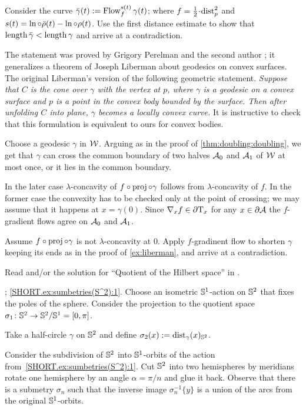 Consider the curve $\bar\gamma(t)\mathrel{:=} \mathop{\rm Flow}\nolimits_f^{s(t)}\gamma(t)$;
where $f=\tfrac12\cdot\distfun_p^2$ and $s(t)=\ln\circ\bar\rho(t)-\ln\circ\rho(t)$.
Use the first distance estimate to show that $\mathop{\rm length}\nolimits\bar\gamma<\mathop{\rm length}\nolimits\gamma$ and arrive at a contradiction.

The statement was proved by Grigory Perelman and the second author \cite{perelman-petrunin};
it generalizes a theorem of Joseph Liberman \cite{liberman} about geodesics on convex surfaces.
The original Liberman's version of the following geometric statement.
\textit{Suppose that $C$ is the cone over $\gamma$ with the vertex at $p$,
where $\gamma$ is a geodesic on a convex surface and $p$ is a point in the convex body bounded by the surface.
Then after unfolding $C$ into plane, $\gamma$ becomes a locally convex curve.}
It is instructive to check that this formulation is equivalent to ours for convex bodies.

Choose a geodesic $\gamma$ in $\mathcal{W}$.
Arguing as in the proof of \ref{thm:doubling:doubling}, we get 
that $\gamma$ can cross the common boundary of two halves $\mathcal{A}_0$ and $\mathcal{A}_1$ of $\mathcal{W}$ at most once, or it lies in the common boundary.

In the later case $\lambda$-concavity of $f\circ\operatorname{\rm proj}\nolimits\circ\gamma$ follows from $\lambda$-concavity of $f$.
In the former case the convexity has to be checked only at the point of crossing;
we may assume that it happens at $x=\gamma(0)$.
Since $\nabla_xf\in\partial\mathrm{T}_x$ for any $x\in\partial\mathcal{A}$ the $f$-gradient flows agree on $\mathcal{A}_0$ and $\mathcal{A}_1$.

Assume $f\circ\operatorname{\rm proj}\nolimits\circ\gamma$ is not $\lambda$-concavity at $0$.
Apply $f$-gradinent flow to shorten $\gamma$ keeping its ends as in the proof of \ref{ex:liberman},
and arrive at a contradiction.

 Read \cite[Section 4]{terng-thorbergsson} and/or the solution for ``Quotient of the Hilbert space'' in \cite{petrunin2020}.

\parbf{\ref{ex:sumbetries(S^2)}}; \ref{SHORT.ex:sumbetries(S^2):1}.
Choose an isometric $\mathbb{S}^1$-action on $\mathbb{S}^2$ that fixes the poles of the sphere.
Consider the projection to the quotient space $\sigma_1\colon\mathbb{S}^2\to \mathbb{S}^2/\mathbb{S}^1=[0,\pi]$.

Take a half-circle $\gamma$ on $\mathbb{S}^2$ and define 
$\sigma_2(x)\mathrel{:=}\mathrm{dist}_\gamma(x)_{\mathbb{S}^2}$.

Consider the subdivision of $\mathbb{S}^2$ into $\mathbb{S}^1$-orbits of the action from~\ref{SHORT.ex:sumbetries(S^2):1}.
Cut $\mathbb{S}^2$ into two hemispheres by meridians rotate one hemisphere by an angle $\alpha=\pi/n$ and glue it back.
Observe that there is a submetry $\sigma_n$ such that the inverse image $\sigma_n^{-1}\{y\}$ is a union of the arcs from the original $\mathbb{S}^1$-orbits.

